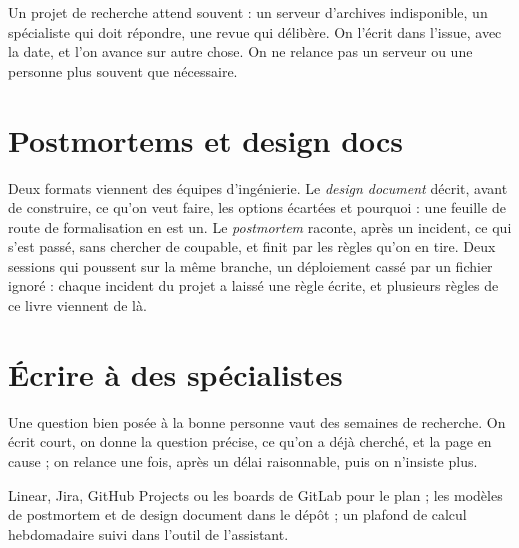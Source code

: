 Un projet de recherche attend souvent : un serveur d'archives indisponible, un spécialiste
qui doit répondre, une revue qui délibère. On l'écrit dans l'issue, avec la date, et l'on
avance sur autre chose. On ne relance pas un serveur ou une personne plus souvent que
nécessaire.

\section{Postmortems et design docs}

Deux formats viennent des équipes d'ingénierie. Le \emph{design document} décrit, avant de
construire, ce qu'on veut faire, les options écartées et pourquoi : une feuille de route de
formalisation en est un. Le \emph{postmortem} raconte, après un incident, ce qui s'est
passé, sans chercher de coupable, et finit par les règles qu'on en tire. Deux sessions qui
poussent sur la même branche, un déploiement cassé par un fichier ignoré : chaque incident
du projet a laissé une règle écrite, et plusieurs règles de ce livre viennent de là.

\section{Écrire à des spécialistes}

Une question bien posée à la bonne personne vaut des semaines de recherche. On écrit
court, on donne la question précise, ce qu'on a déjà cherché, et la page en cause ; on
relance une fois, après un délai raisonnable, puis on n'insiste plus.

\begin{outils}
Linear, Jira, GitHub Projects ou les boards de GitLab pour le plan ; les modèles de
postmortem et de design document dans le dépôt ; un plafond de calcul hebdomadaire suivi
dans l'outil de l'assistant.
\end{outils}
